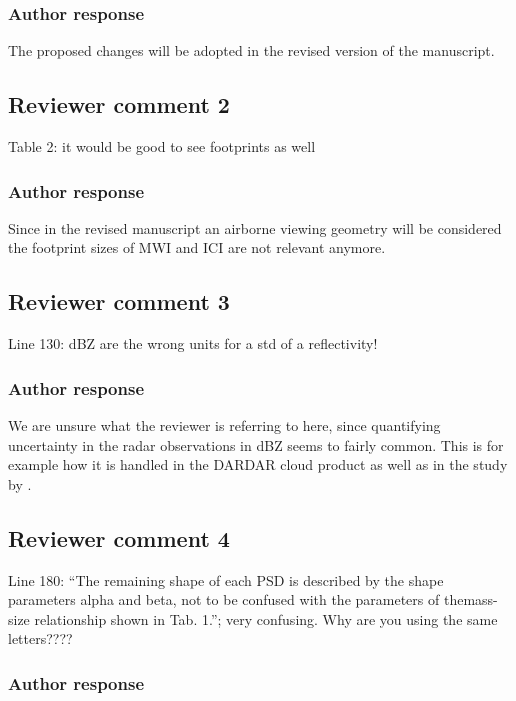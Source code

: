 \documentclass[11pt]{scrartcl}
\begin{document}
\subsubsection*{Author response}

The proposed changes will be adopted in the revised version of the manuscript.

\subsection*{Reviewer comment 2}

Table 2:  it would be good to see footprints as well

\subsubsection*{Author response}

Since in the revised manuscript an airborne viewing geometry will be considered
the footprint sizes of MWI and ICI are not relevant anymore.

\subsection*{Reviewer comment 3}
Line 130: dBZ are the wrong units for a std of a reflectivity!

\subsubsection*{Author response}

We are unsure what the reviewer is referring to here, since quantifying
uncertainty in the radar observations in dBZ seems to fairly common. This is for
example how it is handled in the DARDAR cloud \citep{delanoe10} product as well
as in the study by \citet{jiang19}.

\subsection*{Reviewer comment 4}

Line 180: “The remaining shape of each PSD is described by the shape parameters
alpha and beta, not to be confused with the parameters of themass-size
relationship shown in Tab. 1.”; very confusing. Why are you using the
same letters????

\subsubsection*{Author response}
\end{document}
